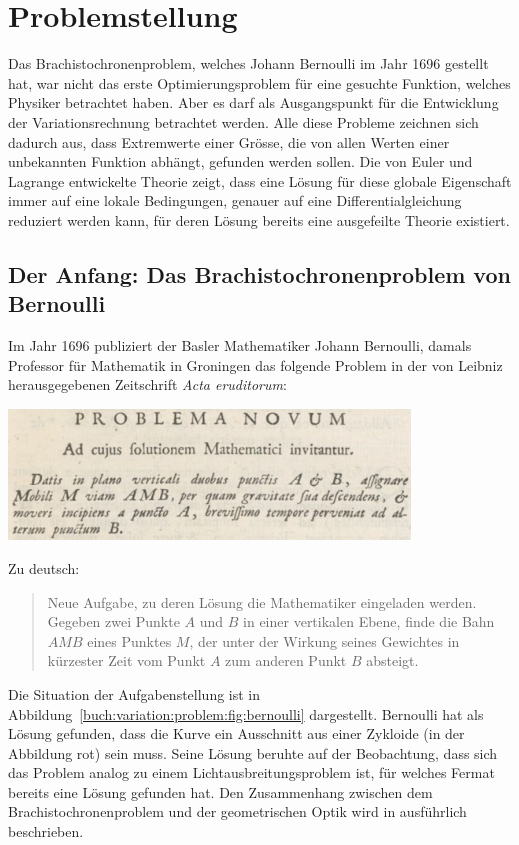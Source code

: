 %
%
%
\section{Problemstellung
\label{buch:variation:section:problemstellung}}
Das Brachistochronenproblem, welches Johann Bernoulli im Jahr 1696
gestellt hat, war nicht das erste Optimierungsproblem für eine 
gesuchte Funktion, welches Physiker betrachtet haben.
Aber es darf als Ausgangspunkt für die Entwicklung der Variationsrechnung
betrachtet werden.
Alle diese Probleme zeichnen sich dadurch aus, dass Extremwerte
einer Grösse, die von allen Werten einer unbekannten Funktion abhängt,
gefunden werden sollen.
Die von Euler und Lagrange entwickelte Theorie zeigt, dass eine
Lösung für diese globale Eigenschaft immer auf eine lokale Bedingungen,
genauer auf eine Differentialgleichung reduziert werden kann, für deren
Lösung bereits eine ausgefeilte Theorie existiert.

%
%
\subsection{Der Anfang: Das Brachistochronenproblem von Bernoulli
\label{buch:variation:problem:subsection:brachistochrone}}
%

Im Jahr 1696 publiziert der Basler Mathematiker Johann Bernoulli, damals
Professor für Mathematik in Groningen das folgende Problem in der
von Leibniz herausgegebenen Zeitschrift {\em Acta eruditorum}:
\begin{center}
\includegraphics[width=0.8\textwidth]{chapters/020-variation/images/latein.jpg}
\end{center}
Zu deutsch:
\begin{quote}
Neue Aufgabe, zu deren Lösung die Mathematiker eingeladen werden.
Gegeben zwei Punkte $A$ und $B$ in einer vertikalen Ebene, finde
die Bahn $AMB$ eines Punktes $M$, der unter der Wirkung seines
Gewichtes in kürzester Zeit vom Punkt $A$ zum anderen Punkt $B$ absteigt.
\end{quote}
Die Situation der Aufgabenstellung ist in
Abbildung~\ref{buch:variation:problem:fig:bernoulli}
dargestellt.
Bernoulli hat als Lösung gefunden, dass die Kurve ein Ausschnitt
aus einer Zykloide (in der Abbildung rot) sein muss.
Seine Lösung beruhte auf der Beobachtung, dass sich das Problem analog
zu einem Lichtausbreitungsproblem ist, für welches Fermat bereits
eine Lösung gefunden hat.
Den Zusammenhang zwischen dem Brachistochronenproblem und der geometrischen
Optik wird in \cite{buch:broer} ausführlich beschrieben.

